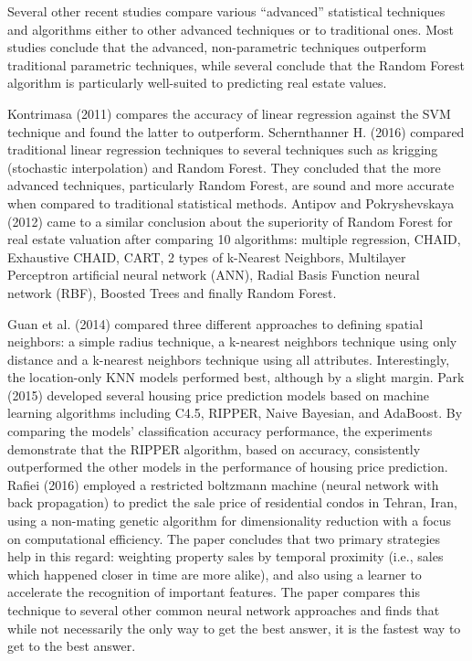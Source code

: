 \documentclass[12pt,]{article}
\begin{document}
Several other recent studies compare various ``advanced'' statistical
techniques and algorithms either to other advanced techniques or to
traditional ones. Most studies conclude that the advanced,
non-parametric techniques outperform traditional parametric techniques,
while several conclude that the Random Forest algorithm is particularly
well-suited to predicting real estate values.

Kontrimasa (2011) compares the accuracy of linear regression against the
SVM technique and found the latter to outperform. Schernthanner H.
(2016) compared traditional linear regression techniques to several
techniques such as krigging (stochastic interpolation) and Random
Forest. They concluded that the more advanced techniques, particularly
Random Forest, are sound and more accurate when compared to traditional
statistical methods. Antipov and Pokryshevskaya (2012) came to a similar
conclusion about the superiority of Random Forest for real estate
valuation after comparing 10 algorithms: multiple regression, CHAID,
Exhaustive CHAID, CART, 2 types of k-Nearest Neighbors, Multilayer
Perceptron artificial neural network (ANN), Radial Basis Function neural
network (RBF), Boosted Trees and finally Random Forest.

Guan et al. (2014) compared three different approaches to defining
spatial neighbors: a simple radius technique, a k-nearest neighbors
technique using only distance and a k-nearest neighbors technique using
all attributes. Interestingly, the location-only KNN models performed
best, although by a slight margin. Park (2015) developed several housing
price prediction models based on machine learning algorithms including
C4.5, RIPPER, Naive Bayesian, and AdaBoost. By comparing the models'
classification accuracy performance, the experiments demonstrate that
the RIPPER algorithm, based on accuracy, consistently outperformed the
other models in the performance of housing price prediction. Rafiei
(2016) employed a restricted boltzmann machine (neural network with back
propagation) to predict the sale price of residential condos in Tehran,
Iran, using a non-mating genetic algorithm for dimensionality reduction
with a focus on computational efficiency. The paper concludes that two
primary strategies help in this regard: weighting property sales by
temporal proximity (i.e., sales which happened closer in time are more
alike), and also using a learner to accelerate the recognition of
important features. The paper compares this technique to several other
common neural network approaches and finds that while not necessarily
the only way to get the best answer, it is the fastest way to get to the
best answer.
\end{document}
